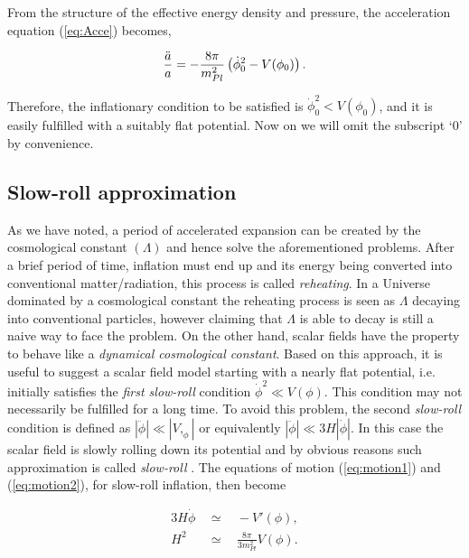 \documentclass{rmaa}
\def\beq{\begin{equation}}
\def\eeq{\end{equation}}
\def\bea{\begin{eqnarray}}
\def\eea{\end{eqnarray}}
\begin{document}
 From the structure of the effective energy density and pressure, the acceleration
  equation (\ref{eq:Acce}) becomes, 
 
 \beq
 {\ddot a \over a} = -{8\pi \over m_{Pl}^2}\left(\dot \phi_0^2-V(\phi_0) \right).
 \eeq
 
 \noindent
 Therefore, the inflationary condition to be satisfied is $\dot \phi_0^2 < V(\phi_0)$, and 
 it is easily fulfilled with a suitably flat potential. Now on we will omit the subscript
 `0' by convenience.



\subsection{Slow-roll approximation}
\vskip 6pt

As we have noted, a period of accelerated expansion can be created by 
the cosmological constant $(\Lambda)$ and hence solve the aforementioned problems.
After a brief period of time, inflation must end up and its energy being converted into conventional
matter/radiation, this process is called \textit{reheating}. In a Universe dominated by a 
cosmological constant the reheating process is seen as $\Lambda$ decaying into 
conventional particles, however claiming that $\Lambda$ is able to decay is still a 
naive way to face the problem.   
%
On the other hand, scalar fields have the property to behave like a 
\textit{dynamical cosmological constant}. Based on this approach, it is useful to
suggest a scalar field model starting with a nearly flat potential, i.e. initially 
satisfies the \textit{first slow-roll} condition $\dot \phi^2 \ll V(\phi)$. 
This condition may not necessarily be fulfilled for a long time.
To avoid this problem, the second \textit{slow-roll} condition is defined as 
$|\ddot{\phi}|\ll |V,_{\phi}|$ or equivalently $|\ddot{\phi}|\ll 3H|\dot{\phi}|$. In this case the scalar field is slowly rolling 
down its potential and by obvious reasons such approximation is called \textit{slow-roll} 
\citep{Liddle92, Liddle94}.
The equations of motion (\ref{eq:motion1}) 
 and (\ref{eq:motion2}), for slow-roll inflation, then become
 
\bea \label{eq:slow}
3H\dot{\phi} ~~ &\simeq& ~~ -V'(\phi), \\
H^2 ~~ & \simeq& ~~ \frac{8\pi}{3m^2_{Pl}} V(\phi). \label{eq:slow2}
\eea
\end{document}
